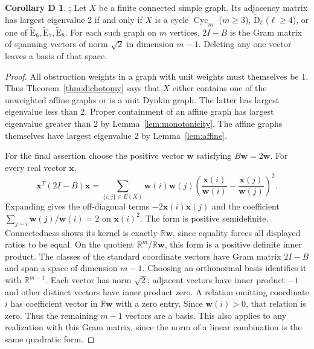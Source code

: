 \documentclass[11pt]{amsart}
\newcommand\re{{\mathbb R}}%
\newcommand\Zw{{\mathbf w}}
\newcommand\Zx{{\mathbf x}}
\newcommand\opk[1]{\mathop{\mathrm{#1}}\nolimits}
\theoremstyle{definition}
\newtheorem*{corollaryD}{Corollary D}
\newcommand{\typ}[1]{\mathrm{#1}}
\newcommand{\Cyc}{\opk{Cyc}}
\begin{document}
\begin{corollaryD}
\textup{\cite[Theorem 3.8]{CGSS}; \cite[Theorem 3.2.5]{BCN}}
Let $X$ be a finite connected simple graph. Its adjacency matrix has
largest eigenvalue 2 if and only if $X$ is a cycle $\Cyc_m$ ($m\geq3$),
$\widetilde{\typ D}_\ell$ ($\ell\geq4$), or one of
$\widetilde{\typ E}_6,\widetilde{\typ E}_7,\widetilde{\typ E}_8$.
For each such graph on $m$ vertices, $2I-B$ is the Gram matrix of
spanning vectors of norm $\sqrt2$ in dimension $m-1$. Deleting any one
vector leaves a basis of that space.
\end{corollaryD}
\begin{proof}
All obstruction weights in a graph with unit weights must themselves be
1. Thus Theorem~\ref{thm:dichotomy} says that $X$ either contains one
of the unweighted affine graphs or is a unit Dynkin graph. The latter
has largest eigenvalue less than 2. Proper containment of an affine graph
has largest eigenvalue greater than 2 by Lemma~\ref{lem:monotonicity}.
The affine graphs themselves have largest eigenvalue 2 by
Lemma~\ref{lem:affine}.

For the final assertion choose the positive vector $\Zw$ satisfying
$B\Zw=2\Zw$. For every real vector $\Zx$,
\begin{equation}\label{eq:affine-form}
 \Zx^T(2I-B)\Zx
 =\sum_{\{i,j\}\in E(X)}\Zw(i)\Zw(j)
       \left(\frac{\Zx(i)}{\Zw(i)}-\frac{\Zx(j)}{\Zw(j)}\right)^2.
\end{equation}
Expanding gives the off-diagonal terms $-2\Zx(i)\Zx(j)$ and the
coefficient $\sum_{j\sim i}\Zw(j)/\Zw(i)=2$ on $\Zx(i)^2$.
The form is positive semidefinite. Connectedness shows its kernel is
exactly $\re\Zw$, since equality forces all displayed ratios to be equal.
On the quotient $\re^m/\re\Zw$, this form is a positive definite inner
product. The classes of the standard coordinate vectors have Gram matrix
$2I-B$ and span a space of dimension $m-1$. Choosing an orthonormal basis
identifies it with $\re^{m-1}$. Each vector has norm $\sqrt2$; adjacent
vectors have inner product $-1$ and other distinct vectors have inner
product zero. A relation omitting coordinate $i$ has coefficient vector
in $\re\Zw$ with a zero entry. Since $\Zw(i)>0$, that relation is zero.
Thus the remaining $m-1$ vectors are a basis. This also applies to any
realization with this Gram matrix, since the norm of a linear combination
is the same quadratic form.
\end{proof}
\end{document}
